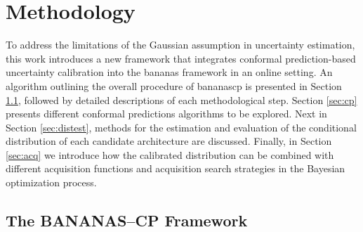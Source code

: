 \chapter{Methodology}
\label{ch3}
To address the limitations of the Gaussian assumption in uncertainty estimation, this work introduces a new framework that integrates conformal prediction-based uncertainty calibration into the \gls{bananas} framework in an online setting. An algorithm outlining the overall procedure of \gls{bananascp} is presented in Section \ref{sec:overview}, followed by detailed descriptions of each methodological step. Section \ref{sec:cp} presents different conformal predictions algorithms to be explored. Next in Section \ref{sec:distest}, methods for the estimation and evaluation of the conditional distribution of each candidate architecture are discussed. Finally, in Section \ref{sec:acq} we introduce how the calibrated distribution can be combined with different acquisition functions and acquisition search strategies in the Bayesian optimization process.


\section{The BANANAS--CP Framework}
\label{sec:overview}

